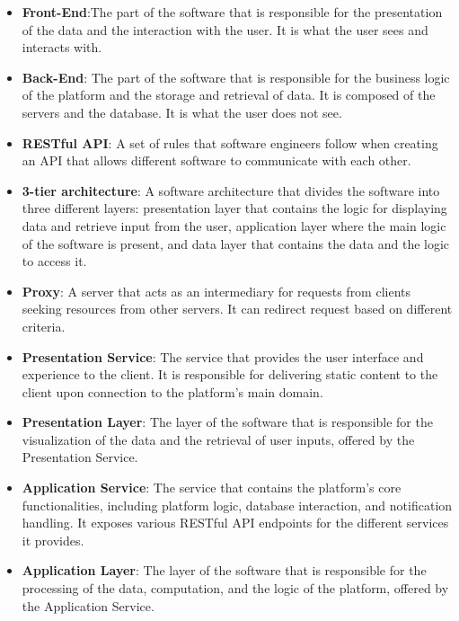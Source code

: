 \begin{itemize}
    \item \textcolor{titleColor}{\textbf{Front-End}\label{def:frontEnd}}:The part of the software that is responsible for the presentation of the data and the interaction with the user. It is what the user sees and interacts with.
    \item \textcolor{titleColor}{\textbf{Back-End}\label{def:backEnd}}: The part of the software that is responsible for the business logic of the platform and the storage and retrieval of data. It is composed of the servers and the database. It is what the user does not see.
    \item \textcolor{titleColor}{\textbf{RESTful API}\label{def:restAPI}}: A set of rules that software engineers follow when creating an API that allows different software to communicate with each other.
    \item \textcolor{titleColor}{\textbf{3-tier architecture}\label{def:3TierArchitecture}}: A software architecture that divides the software into three different layers: presentation layer that contains the logic for displaying data and retrieve input from the user, application layer where the main logic of the software is present, and data layer that contains the data and the logic to access it.
    \item \textcolor{titleColor}{\textbf{Proxy}\label{def:proxy}}: A server that acts as an intermediary for requests from clients seeking resources from other servers. It can redirect request based on different criteria.
    \item \textcolor{titleColor}{\textbf{Presentation Service}\label{def:PresentationService}}: The service that provides the user interface and experience to the client. It is responsible for delivering static content to the client upon connection to the platform's main domain.
    \item \textcolor{titleColor}{\textbf{Presentation Layer}\label{def:PresentationLayer}}: The layer of the software that is responsible for the visualization of the data and the retrieval of user inputs, offered by the Presentation Service.
    \item \textcolor{titleColor}{\textbf{Application Service}\label{def:ApplicationService}}: The service that contains the platform's core functionalities, including platform logic, database interaction, and notification handling. It exposes various RESTful API endpoints for the different services it provides.
    \item \textcolor{titleColor}{\textbf{Application Layer}\label{def:ApplicationLayer}}: The layer of the software that is responsible for the processing of the data, computation, and the logic of the platform, offered by the Application Service.

\end{itemize}

